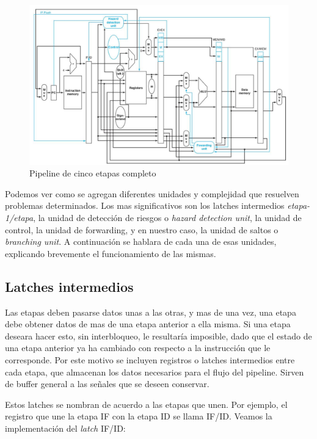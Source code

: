 \documentclass[12pt]{article}
\begin{document}
\begin{figure}[ht]
\centering
\includegraphics[width=1\textwidth]{imagenes/esquema_pipeline_completo.jpeg}
\caption{Pipeline de cinco etapas completo \cite{patterson}}
\label{fig:pipelinecompleto}
\end{figure}

Podemos ver como se agregan diferentes unidades y complejidad que resuelven problemas determinados. Los mas significativos son los latches intermedios \textit{etapa-1/etapa}, la unidad de detección de riesgos o \textit{hazard detection unit}, la unidad de control, la unidad de forwarding, y en nuestro caso, la unidad de saltos o \textit{branching unit}. A continuación se hablara de cada una de esas unidades, explicando brevemente el funcionamiento de las mismas.

\subsection{Latches intermedios}

Las etapas deben pasarse datos unas a las otras, y mas de una vez, una etapa debe obtener datos de mas de una etapa anterior a ella misma. Si una etapa deseara hacer esto, sin interbloqueo, le resultaría imposible, dado que el estado de una etapa anterior ya ha cambiado con respecto a la instrucción que le corresponde. Por este motivo se incluyen registros o latches intermedios entre cada etapa, que almacenan los datos necesarios para el flujo del pipeline. Sirven de buffer general a las señales que se deseen conservar.

Estos latches se nombran de acuerdo a las etapas que unen. Por ejemplo, el registro que une la etapa IF con la etapa ID se llama IF/ID. Veamos la implementación del \textit{latch} IF/ID:
\end{document}
